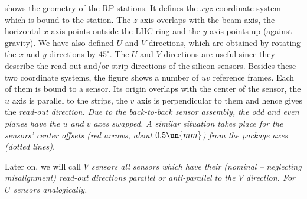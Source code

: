 

 shows the geometry of the RP stations. It defines the $xyz$ coordinate system which is bound to the station. The $z$ axis overlaps with the beam axis, the horizontal $x$ axis points outside the LHC ring and the $y$ axis points up (against gravity). We have also defined $U$ and $V$ directions, which are obtained by rotating the $x$ and $y$ directions by $45^\circ$. The $U$ and $V$ directions are useful since they describe the read-out and/or strip directions of the silicon sensors. Besides these two coordinate systems, the figure shows a number of $uv$ reference frames. Each of them is bound to a sensor. Its origin overlaps with the center of the sensor, the $u$ axis is parallel to the strips, the $v$ axis is perpendicular to them and hence gives the \em{read-out direction}. Due to the back-to-back sensor assembly, the odd and even planes have the $u$ and $v$ axes swapped. A similar situation takes place for the sensors' center offsets (red arrows, about $0.5\un{mm}$) from the package axes (dotted lines).

Later on, we will call \em{$V$ sensors} all sensors which have their (nominal -- neglecting misalignment) read-out directions parallel or anti-parallel to the $V$ direction. For $U$ sensors analogically.



